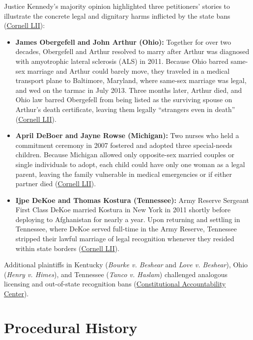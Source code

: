\documentclass[12pt]{article}
\begin{document}
Justice Kennedy's majority opinion highlighted three petitioners' stories to illustrate the concrete legal and dignitary harms inflicted by the state bans (\href{https://www.law.cornell.edu/supremecourt/text/14-556}{Cornell LII}):
\begin{itemize}
    \item \textbf{James Obergefell and John Arthur (Ohio):} Together for over two decades, Obergefell and Arthur resolved to marry after Arthur was diagnosed with amyotrophic lateral sclerosis (ALS) in 2011. Because Ohio barred same-sex marriage and Arthur could barely move, they traveled in a medical transport plane to Baltimore, Maryland, where same-sex marriage was legal, and wed on the tarmac in July 2013. Three months later, Arthur died, and Ohio law barred Obergefell from being listed as the surviving spouse on Arthur's death certificate, leaving them legally ``strangers even in death'' (\href{https://www.law.cornell.edu/supremecourt/text/14-556}{Cornell LII}).
    \item \textbf{April DeBoer and Jayne Rowse (Michigan):} Two nurses who held a commitment ceremony in 2007 fostered and adopted three special-needs children. Because Michigan allowed only opposite-sex married couples or single individuals to adopt, each child could have only one woman as a legal parent, leaving the family vulnerable in medical emergencies or if either partner died (\href{https://www.law.cornell.edu/supremecourt/text/14-556}{Cornell LII}).
    \item \textbf{Ijpe DeKoe and Thomas Kostura (Tennessee):} Army Reserve Sergeant First Class DeKoe married Kostura in New York in 2011 shortly before deploying to Afghanistan for nearly a year. Upon returning and settling in Tennessee, where DeKoe served full-time in the Army Reserve, Tennessee stripped their lawful marriage of legal recognition whenever they resided within state borders (\href{https://www.law.cornell.edu/supremecourt/text/14-556}{Cornell LII}).
\end{itemize}
Additional plaintiffs in Kentucky (\textit{Bourke v. Beshear} and \textit{Love v. Beshear}), Ohio (\textit{Henry v. Himes}), and Tennessee (\textit{Tanco v. Haslam}) challenged analogous licensing and out-of-state recognition bans (\href{https://www.theusconstitution.org/litigation/de-boer-v-snyder-6th-cir/}{Constitutional Accountability Center}).

\section{Procedural History}
\end{document}
